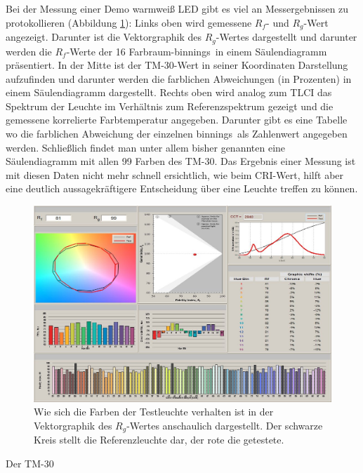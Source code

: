 Bei der Messung einer Demo warmweiß LED gibt es viel an Messergebnissen zu protokollieren (Abbildung \ref{b_tm304}): Links oben wird gemessene $R_{f}$- und $R_{g}$-Wert angezeigt. Darunter ist die Vektorgraphik des $R_{g}$-Wertes dargestellt und darunter werden die $R_{f}$-Werte der 16 Farbraum-\glqq binnings\grqq\  in einem Säulendiagramm präsentiert. In der Mitte ist der TM-30-Wert in seiner Koordinaten Darstellung aufzufinden und darunter werden die farblichen Abweichungen (in Prozenten) in einem Säulendiagramm dargestellt. Rechts oben wird analog zum TLCI das Spektrum der Leuchte im Verhältnis zum Referenzspektrum gezeigt und die gemessene korrelierte Farbtemperatur angegeben. Darunter gibt es eine Tabelle wo die farblichen Abweichung der einzelnen \glqq binnings\grqq\ als Zahlenwert angegeben werden. Schließlich findet man unter allem bisher genannten eine Säulendiagramm mit allen 99 Farben des TM-30. 
Das Ergebnis einer Messung ist mit diesen Daten nicht mehr schnell ersichtlich, wie beim CRI-Wert, hilft aber eine deutlich aussagekräftigere Entscheidung über eine Leuchte treffen zu können. 

\begin{figure}[H]     %
\centering
\includegraphics[width=1.0\textwidth]{bilder/tm304} 
\caption {Wie sich die Farben der Testleuchte verhalten ist in der Vektorgraphik des $R_{g}$-Wertes anschaulich dargestellt. Der schwarze Kreis stellt die Referenzleuchte dar, der rote die getestete.  \protect\footnotemark}\label{b_tm304}
\end{figure}

Der TM-30 


